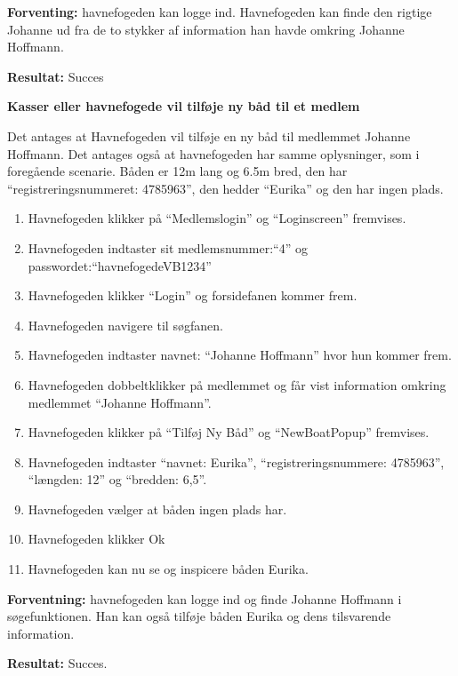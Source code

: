 \textbf{Forventing:} havnefogeden kan logge ind. Havnefogeden kan finde den rigtige Johanne ud fra de to stykker af information han havde omkring Johanne Hoffmann.

\textbf{Resultat:} Succes


\textbf{Kasser eller havnefogede vil tilføje ny båd til et medlem}

Det antages at Havnefogeden vil tilføje en ny båd til medlemmet Johanne Hoffmann. Det antages også at havnefogeden har samme oplysninger, som i foregående scenarie. Båden er 12m lang og 6.5m bred, den har \enquote{registreringsnummeret: 4785963}, den hedder \enquote{Eurika} og den har ingen plads.
\begin{enumerate}
	\item Havnefogeden klikker på \enquote{Medlemslogin} og \enquote{Loginscreen} fremvises.
	\item Havnefogeden indtaster sit medlemsnummer:\enquote{4} og passwordet:\enquote{havnefogedeVB1234}
	\item Havnefogeden klikker \enquote{Login} og forsidefanen kommer frem.
	\item Havnefogeden navigere til søgfanen.
	\item Havnefogeden indtaster navnet: \enquote{Johanne Hoffmann} hvor hun kommer frem.
	\item Havnefogeden dobbeltklikker på medlemmet og får vist information omkring medlemmet \enquote{Johanne Hoffmann}.
	\item Havnefogeden klikker på \enquote{Tilføj Ny Båd} og \enquote{NewBoatPopup} fremvises.
	\item Havnefogeden indtaster \enquote{navnet: Eurika}, \enquote{registreringsnummere: 4785963}, \enquote{længden: 12} og \enquote{bredden: 6,5}.
	\item Havnefogeden vælger at båden ingen plads har.
	\item Havnefogeden klikker Ok
	\item Havnefogeden kan nu se og inspicere båden Eurika.
\end{enumerate}

\textbf{Forventning:} havnefogeden kan logge ind og finde Johanne Hoffmann i søgefunktionen. Han kan også tilføje båden Eurika og dens  tilsvarende information.

\textbf{Resultat:} Succes.



